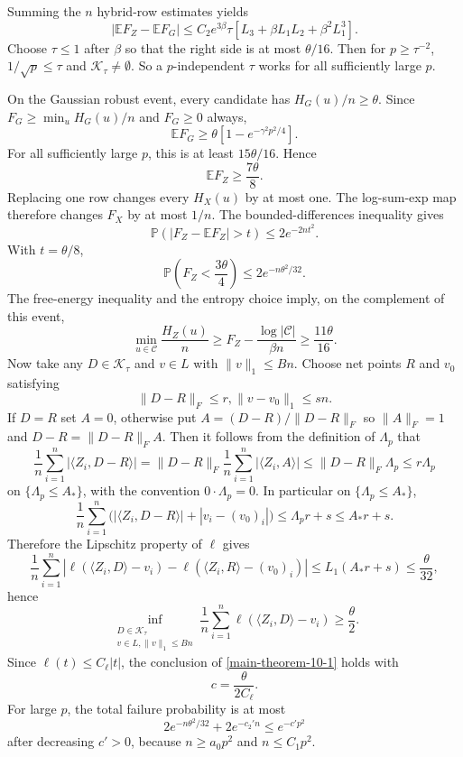 \documentclass[11pt]{article}
\numberwithin{equation}{section}
\theoremstyle{definition}
\theoremstyle{remark}
\newcommand{\E}{\mathbb E}
\newcommand{\Pp}{\mathbb P}
\newcommand{\1}{\boldsymbol 1}
\begin{document}
\begin{aiblock}
Summing the $n$ hybrid-row estimates yields
\[
    |\E F_Z - \E F_G| \le C_2 e^{3\beta} \tau [L_3 + \beta L_1 L_2 + \beta^2 L_1^3].
\]
Choose $\tau \le 1$ after $\beta$ so that the right side is at most $\theta / 16$. Then for $p \ge \tau^{-2}$, $1/\sqrt p \le \tau$ and ${\mathcal K}_\tau \neq \emptyset$. So a $p$-independent $\tau$ works for all sufficiently large $p$.

On the Gaussian robust event, every candidate has $H_G(u) / n \ge \theta$. Since $F_G \ge \min_u H_G(u) / n$ and $F_G \ge 0$ always,
\[
    \E F_G \ge \theta[1 - e^{-\gamma^2 p^2 / 4}].
\]
For all sufficiently large $p$, this is at least $15 \theta / 16$. Hence
\[
    \E F_Z \ge \frac{7 \theta}{8}.
\]
Replacing one row changes every $H_X(u)$ by at most one.
The log-sum-exp map therefore changes $F_X$ by at most $1 / n$. The bounded-differences inequality \cite{McDiarmid1989} gives
\[
    \Pp(|F_Z - \E F_Z| > t) \le 2 e^{-2 n t^2}.
\]
With $t = \theta / 8$,
\[
    \Pp\left(F_Z < \frac{3 \theta}{4}\right) \le 2 e^{-n \theta^2 / 32}.
\]
The free-energy inequality and the entropy choice imply, on the complement of this event,
\[
    \min_{u \in \mathcal C} \frac{H_Z(u)} n \ge F_Z - \frac{\log|\mathcal C|}{\beta n} \ge \frac{11 \theta}{16}.
\]
Now take any $D \in \mathcal K_\tau$ and $v\in L$ with $\|v\|_1 \le B n$. Choose net points $R$ and $v_0$ satisfying
\[
    \|D - R\|_F \le r, \|v - v_0\|_1 \le s n.
\]
If $D = R$ set $A = 0$, otherwise put $A = (D - R) / \|D - R\|_F$ so $\|A\|_F = 1$ and $D - R = \|D - R\|_F A$. Then it follows from the definition of $\Lambda_p$ that
\[
    \frac{1}{n} \sum_{i = 1}^n |\langle Z_i, D - R \rangle| = \|D - R\|_F \frac{1}{n} \sum_{i = 1}^n |\langle Z_i, A\rangle| \le \|D - R\|_F \Lambda_p \le r \Lambda_p
\]
on $\{\Lambda_p \le A_*\}$, with the convention $0 \cdot \Lambda_p = 0$. In particular on $\{\Lambda_p \le A_*\}$,
\[
    \frac{1}{n} \sum_{i = 1}^n \big(|\langle Z_i, D - R \rangle| + |v_i - (v_0)_i|\big) \le \Lambda_p r + s \le A_*r + s.
\]
Therefore the Lipschitz property of $\ell$ gives
\[
    \frac{1}{n} \sum_{i = 1}^n |\ell(\langle Z_i, D \rangle - v_i) - \ell(\langle Z_i, R \rangle - (v_0)_i)| \le L_1(A_* r + s) \le \frac{\theta}{32},
\]
hence
\[
    \inf_{\substack{D \in \mathcal K_\tau \\ v \in L, \|v\|_1 \le B n}} \frac{1}{n}\sum_{i = 1}^n \ell(\langle Z_i, D \rangle - v_i) \ge \frac{\theta}{2}.
\]
Since $\ell(t) \le C_\ell |t|$, the conclusion of \cref{main-theorem-10-1} holds with
\[
    c = \frac\theta{2 C_\ell}.
\]
For large $p$, the total failure probability is at most
\[
    2 e^{-n \theta^2 / 32} + 2 e^{-c_2' n} \le e^{-c'p^2}
\]
after decreasing $c' > 0$, because $n \ge a_0 p^2$ and $n \le C_1 p^2$.


\end{aiblock}
\end{document}

